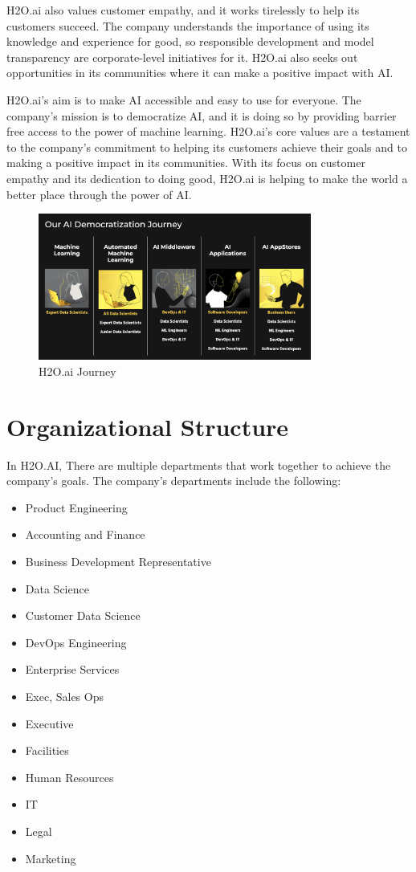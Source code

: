 \documentclass[12pt,a4paper]{report}
\begin{document}
H2O.ai also values customer empathy, and it works tirelessly to help its customers succeed. The company understands the importance of using its knowledge and experience for good, so responsible development and model transparency are corporate-level initiatives for it. H2O.ai also seeks out opportunities in its communities where it can make a positive impact with AI.

H2O.ai's aim is to make AI accessible and easy to use for everyone. The company's mission is to democratize AI, and it is doing so by providing barrier free access to the power of machine learning. H2O.ai's core values are a testament to the company's commitment to helping its customers achieve their goals and to making a positive impact in its communities. With its focus on customer empathy and its dedication to doing good, H2O.ai is helping to make the world a better place through the power of AI.

\begin{figure}[htbp]
\centering
\includegraphics[width=0.8\textwidth]{journey.png}
\caption{H2O.ai Journey}
\end{figure}

\section{Organizational Structure}

In H2O.AI, There are multiple departments that work together to achieve the company's goals. The company's departments include the following: \\
\begin{itemize}
\item Product Engineering
\item Accounting and Finance
\item Business Development Representative
\item Data Science
\item Customer Data Science
\item DevOps Engineering
\item Enterprise Services
\item Exec, Sales Ops
\item Executive
\item Facilities
\item Human Resources
\item IT
\item Legal
\item Marketing

\end{itemize}
\end{document}
